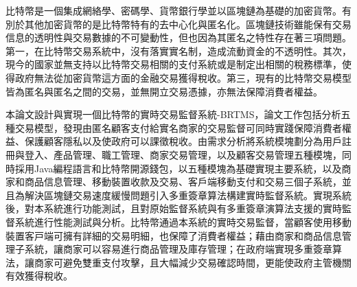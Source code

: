
\begin{cabstract}

	⽐特幣是⼀個集成網絡學、密碼學、貨幣銀⾏學並以區塊鏈為基礎的加密貨幣。有別於其他加密貨幣的是⽐特幣特有的去中⼼化與匿名化。區塊鏈技術雖能保有交易信息的透明性與交易數據的不可變動性，但也因為其匿名之特性存在著三項問題。第一，在⽐特幣交易系統中，沒有落實實名制，造成流動資金的不透明性。其次，現今的國家並無⽀持以⽐特幣交易相關的⽀付系統或是制定出相關的稅務標準，使得政府無法從加密貨幣這⽅⾯的⾦融交易獲得稅收。第三，現有的⽐特幣交易模型皆為匿名與匿名之間的交易，並無開⽴交易憑據，亦無法保障消費者權益。

	本論⽂設計與實現⼀個比特幣的實時交易監督系統-BRTMS，論文工作包括分析五種交易模型，發現由匿名顧客支付給實名商家的交易監督可同時實踐保障消費者權益、保護顧客隱私以及使政府可以課徵稅收。由需求分析將系統模塊劃分為用戶註冊與登入、產品管理、職工管理、商家交易管理，以及顧客交易管理五種模塊，同時採用Java編程語言和比特幣開源錢包，以五種模塊為基礎實現主要系統，以及商家和商品信息管理、移動裝置收款及交易、客戶端移動支付和交易三個子系統，並且為解決區塊鏈交易速度緩慢問題引入多重簽章算法構建實時監督系統。實現系統後，對本系統進行功能測試，且對原始監督系統與有多重簽章演算法支援的實時監督系統進行性能測試與分析。比特幣通過本系統的實時交易監督，當顧客使用移動裝置客⼾端可擁有詳細的交易明細，也保障了消費者權益；藉由商家和商品信息管理子系統，讓商家可以容易進⾏商品管理及庫存管理；在政府端實現多重簽章算法，讓商家可避免雙重⽀付攻擊，且大幅減少交易確認時間，更能使政府主管機關有效獲得稅收。

\end{cabstract}

